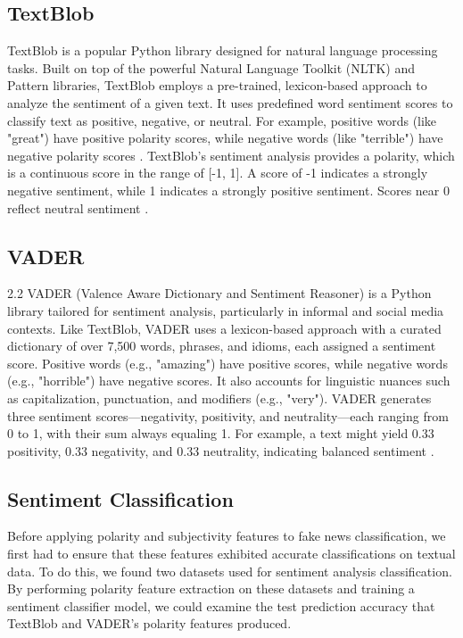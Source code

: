 \documentclass[twocolumn,10pt]{article}
\begin{document}
\subsection{TextBlob}
TextBlob \cite{5} is a popular Python library designed for natural language processing tasks. Built on top of the powerful Natural Language Toolkit (NLTK) \cite{7} and Pattern libraries, TextBlob employs a pre-trained, lexicon-based approach to analyze the sentiment of a given text. It uses predefined word sentiment scores to classify text as positive, negative, or neutral. For example, positive words (like "great") have positive polarity scores, while negative words (like "terrible") have negative polarity scores \cite{5}. TextBlob's sentiment analysis provides a polarity, which is a continuous score in the range of [-1, 1]. A score of -1 indicates a strongly negative sentiment, while 1 indicates a strongly positive sentiment. Scores near 0 reflect neutral sentiment \cite{5}.

\subsection{VADER}
2.2 VADER \cite{6} (Valence Aware Dictionary and Sentiment Reasoner) is a Python library tailored for sentiment analysis, particularly in informal and social media contexts. Like TextBlob, VADER uses a lexicon-based approach with a curated dictionary of over 7,500 words, phrases, and idioms, each assigned a sentiment score. Positive words (e.g., "amazing") have positive scores, while negative words (e.g., "horrible") have negative scores. It also accounts for linguistic nuances such as capitalization, punctuation, and modifiers (e.g., "very"). VADER generates three sentiment scores—negativity, positivity, and neutrality—each ranging from 0 to 1, with their sum always equaling 1. For example, a text might yield 0.33 positivity, 0.33 negativity, and 0.33 neutrality, indicating balanced sentiment \cite{6}.

\subsection{Sentiment Classification}
Before applying polarity and subjectivity features to fake news classification, we first had to ensure that these features exhibited accurate classifications on textual data. To do this, we found two datasets used for sentiment analysis classification. By performing polarity feature extraction on these datasets and training a sentiment classifier model, we could examine the test prediction accuracy that TextBlob and VADER’s polarity features produced.
\end{document}
